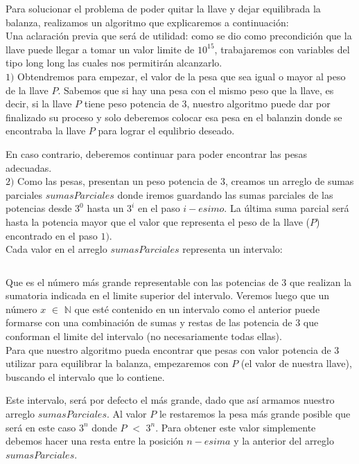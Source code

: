 
Para solucionar el problema de poder quitar la llave y dejar equilibrada la balanza, realizamos un algoritmo que explicaremos a continuaci\'on:\\

Una aclaraci\'on previa que ser\'a de utilidad: como se dio como precondici\'on que la llave puede llegar a tomar un valor limite de $10^{15}$, trabajaremos con variables del tipo long long las cuales nos permitir\'an alcanzarlo.\\

$1)$ Obtendremos para empezar, el valor de la pesa que sea igual o mayor al peso de la llave $P$.
Sabemos que si hay una pesa con el mismo peso que la llave, es decir, si la llave $P$ tiene peso potencia de 3, nuestro algoritmo puede dar por finalizado su proceso y solo deberemos colocar esa pesa en el balanzin donde se encontraba la llave $P$ para lograr el equlibrio deseado.

En caso contrario, deberemos continuar para poder encontrar las pesas adecuadas.\\

$2)$ Como las pesas, presentan un peso potencia de 3, creamos un arreglo de sumas parciales $sumasParciales$ donde iremos guardando las sumas parciales de las potencias desde $3^0$ hasta un $3^i$ en el paso $i-esimo$. La última suma parcial será hasta la potencia mayor que el valor que representa el peso de la llave ($P$) encontrado en el paso $1)$.\\

Cada valor en el arreglo $sumasParciales$ representa un intervalo:

\begin{equation}
[0, \sum_{j=0}^{i}(3^j)]
\end{equation} 

Que es el número más grande representable con las potencias de 3 que realizan la sumatoria indicada en el limite superior del intervalo.
Veremos luego que un número $x$ $\in$ $\mathbb{N}$ que esté contenido en un intervalo como el anterior puede formarse con una combinación de sumas y restas de las potencia de 3 que conforman el limite del intervalo (no necesariamente todas ellas).\\  

Para que nuestro algoritmo pueda encontrar que pesas con valor potencia de 3 utilizar para equilibrar la balanza, empezaremos con $P$ (el valor de nuestra llave), buscando el intervalo que lo contiene. 

Este intervalo, será por defecto el más grande, dado que así armamos nuestro arreglo $sumasParciales$. 
Al valor $P$ le restaremos la pesa más grande posible que será en este caso $3^n$ donde $P$ $<$ $3^n$. Para obtener este valor simplemente debemos hacer una resta entre la posición $n-esima$ y la anterior del arreglo $sumasParciales$.   



